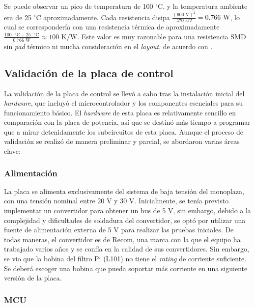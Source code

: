 Se puede observar un pico de temperatura de 100 $^{\circ}$C, y la temperatura ambiente era de 25 $^{\circ}$C aproximadamente. Cada resistencia disipa $\frac{(600 \text{ V})^2}{470 \text{ k}\Omega} = 0.766 \text{ W}$, lo cual se correspondería con una resistencia térmica de aproximadamente $ \frac{100 \text{ }^{\circ}\text{C} - 25 \text{ }^{\circ}\text{C}}{0.766 \text{ W}} \approx 100 \text{ K/W}$. Este valor es muy razonable para una resistencia SMD sin \textit{pad} térmico ni mucha consideración en el \textit{layout}, de acuerdo con \cite{vishay_application_note}.

\subsection{Validación de la placa de control}

La validación de la placa de control se llevó a cabo tras la instalación inicial del \textit{hardware}, que incluyó el microcontrolador y los componentes esenciales para su funcionamiento básico. El \textit{hardware} de esta placa es relativamente sencillo en comparación con la placa de potencia, así que se destinó más tiempo a programar que a mirar detenidamente los subcircuitos de esta placa. Aunque el proceso de validación se realizó de manera preliminar y parcial, se abordaron varias áreas clave:

\subsubsection{Alimentación}

La placa se alimenta exclusivamente del sistema de baja tensión del monoplaza, con una tensión nominal entre 20 V y 30 V. Inicialmente, se tenía previsto implementar un convertidor para obtener un bus de 5 V, sin embargo, debido a la complejidad y dificultades de soldadura del convertidor, se optó por utilizar una fuente de alimentación externa de 5 V para realizar las pruebas iniciales. De todas maneras, el convertidor es de Recom, una marca con la que el equipo ha trabajado varios años y se confía en la calidad de sus convertidores. Sin embargo, se vio que la bobina del filtro Pi (L101) no tiene el \textit{rating} de corriente suficiente. Se deberá escoger una bobina que pueda soportar más corriente en una siguiente versión de la placa.

\subsubsection{MCU}

